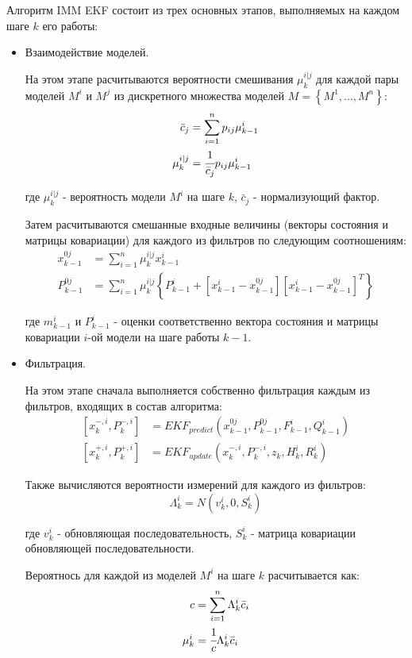 \documentclass[14pt]{article}
\begin{document}
Алгоритм IMM EKF состоит из трех основных этапов, выполняемых на каждом шаге $k$ его работы:
\begin{itemize}
\item Взаимодействие моделей. 

На этом этапе расчитываются вероятности смешивания $\mu^{i|j}_k$ для каждой пары моделей $M^i$ и $M^j$ из дискретного множества моделей $M = \left\{M^1,...,M^n\right\}$:
\begin{align}
	\bar c_j &= \sum_{i=1}^np_{ij}\mu_{k-1}^i\\
	\mu^{i|j}_k &= \cfrac{1}{\bar c_j}p_{ij}\mu_{k-1}^i
\end{align}

где  $\mu^{i|j}_k$ - вероятность модели $M^i$ на шаге $k$, $\bar c_j$ - нормализующий фактор.

Затем расчитываются смешанные входные величины (векторы состояния и матрицы ковариации) для каждого из фильтров по следующим соотношениям:
\begin{align}
	x_{k-1}^{0j} &= \sum_{i=1}^n\mu^{i|j}_kx_{k-1}^i\\
	P_{k-1}^{0j} & = \sum_{i=1}^n\mu^{i|j}_k\left\{P_{k-1}^i+\left[x_{k-1}^i-x_{k-1}^{0j}\right]\left[x_{k-1}^i-x_{k-1}^{0j}\right]^T\right\}
\end{align}

где $m_{k-1}^i$ и $P_{k-1}^i$ - оценки соответственно вектора состояния и матрицы ковариации $i$-ой модели на шаге работы $k-1$.

\item  Фильтрация. 

На этом этапе сначала выполняется собственно фильтрация каждым из фильтров, входящих в состав алгоритма:
\begin{align}
	\left[x_k^{-,i},P_k^{-,i}\right] &= EKF_{predict}\left(x_{k-1}^{0j},P_{k-1}^{0j},F_{k-1}^i,Q_{k-1}^i\right)\\
	\left[x_k^{+,i},P_k^{+,i}\right] &=EKF_{update}\left(x_k^{-,i},P_k^{-,i},z_k,H_k^i,R_k^i\right)
\end{align}

Также вычисляются вероятности измерений для каждого из фильтров:
\begin{equation}
	\Lambda_k^i = N\left(v_k^i,0,S_k^i\right)
\end{equation}

где $v_k^i$ - обновляющая последовательность, $S_k^i$ - матрица ковариации обновляющей последовательности.

Вероятнось для каждой из моделей $M^i$ на шаге $k$ расчитывается как:
\begin{align}
	c &= \sum_{i=1}^n \Lambda_k^i \bar c_i \\
	\mu_k^i &= \cfrac{1}{c}\Lambda_k^i\bar c_i
\end{align}


\end{itemize}
\end{document}
